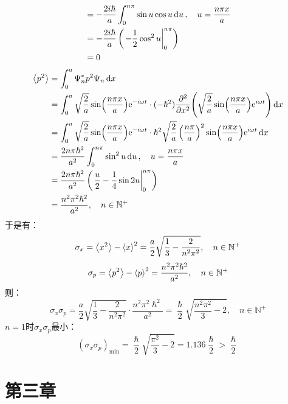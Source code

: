 \documentclass[a4paper,fontset=none]{ctexart}
\renewcommand\hbar\hslash
\begin{document}
\begin{itemize}
\begin{align*}
            &= -\frac{2i\hbar}{a} \int_0^{n\pi} \sin{u} \cos{u} \dd{u},\quad u = \frac{n\pi x}{a} \\
            &= -\frac{2i\hbar}{a} \left(\eval{-\frac{1}{2}\cos^2{u}}_0^{n\pi}\right)\\
            &= 0
        \end{align*}
        \begin{align*}
            \expval{p^2}
            &= \int_0^a \Psi_n^* p^2 \Psi_n \dd{x} \\
            &= \int_0^a \sqrt{\frac{2}{a}}\sin(\frac{n\pi x}{a})\mathrm{e}^{-i\omega t} \cdot (-\hbar^2) \pdv[2]{x}(\sqrt{\frac{2}{a}}\sin(\frac{n\pi x}{a})\mathrm{e}^{i\omega t}) \dd{x} \\
            &= \int_0^a \sqrt{\frac{2}{a}}\sin(\frac{n\pi x}{a})\mathrm{e}^{-i\omega t} \cdot \hbar^2 \sqrt{\frac{2}{a}} \left(\frac{n\pi}{a}\right)^2 \sin(\frac{n\pi x}{a})\mathrm{e}^{i\omega t} \dd{x} \\
            &= \frac{2n\pi\hbar^2}{a^2} \int_0^{n\pi} \sin^2{u} \dd{u},\quad u = \frac{n\pi x}{a} \\
            &= \frac{2n\pi\hbar^2}{a^2} \left(\eval{\frac{u}{2} - \frac{1}{4}\sin{2u}}_0^{n\pi}\right)\\
            &= \frac{n^2 \pi^2 \hbar^2}{a^2},\quad n \in \mathbb{N}^+
        \end{align*}
        于是有：
        \[
            \sigma_x = \expval{x^2} - \expval{x}^2 = \frac{a}{2}\sqrt{\frac{1}{3} - \frac{2}{n^2 \pi^2}},\quad n \in \mathbb{N}^+
        \]
        \[
            \sigma_p = \expval{p^2} - \expval{p}^2 = \frac{n^2 \pi^2 \hbar^2}{a^2},\quad n \in \mathbb{N}^+
        \]
        则：
        \[
            \sigma_x \sigma_p = \frac{a}{2}\sqrt{\frac{1}{3} - \frac{2}{n^2 \pi^2}} \cdot \frac{n^2 \pi^2 \hbar^2}{a^2} = \frac{\hbar}{2}\sqrt{\frac{n^2 \pi^2}{3} - 2},\quad n \in \mathbb{N}^+
        \]
        $n=1$时$\sigma_x \sigma_p$最小：
        \[
            (\sigma_x \sigma_p)_{\mathrm{min}} = \dfrac{\hbar}{2}\sqrt{\dfrac{\pi^2}{3} - 2} = 1.136\dfrac{\hbar}{2} > \dfrac{\hbar}{2}
        \]
    \end{itemize}

    \newpage
    \section*{第三章}
\end{document}

